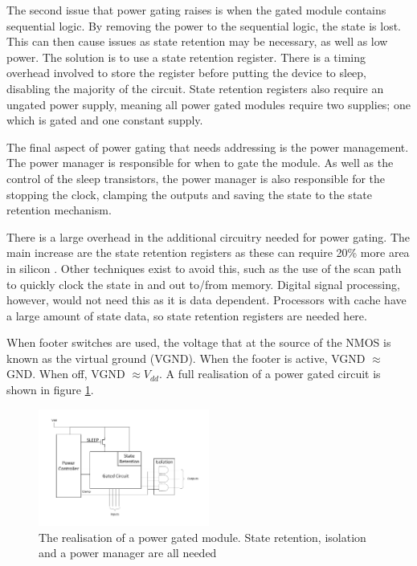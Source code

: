 The second issue that power gating raises is when the gated module contains sequential logic. 
By removing the power to the sequential logic, the state is lost. 
This can then cause issues as state retention may be necessary, as well as low power.
The solution is to use a state retention register. 
There is a timing overhead involved to store the register before putting the device to sleep, disabling the majority of the circuit. 
State retention registers also require an ungated power supply, meaning all power gated modules require two supplies; one which is gated and one constant supply.

The final aspect of power gating that needs addressing is the power management.
The power manager is responsible for when to gate the module.%
As well as the control of the sleep transistors, the power manager is also responsible for the stopping the clock, clamping the outputs and saving the state to the state retention mechanism.

There is a large overhead in the additional circuitry needed for power gating. 
The main increase are the state retention registers as these can require 20\% more area in silicon \cite{stateretarea}. 
Other techniques exist to avoid this, such as the use of the scan path to quickly clock the state in and out to/from memory.
Digital signal processing, however, would not need this as it is data dependent. 
Processors with cache have a large amount of state data, so state retention registers are needed here.

When footer switches are used, the voltage that at the source of the NMOS is known as the virtual ground (VGND). When the footer is active, VGND $\approx$ GND. When off, VGND $\approx V_{dd}$.
A full realisation of a power gated circuit is shown in figure \ref{fig:powergated}. 


\begin{figure}
\includegraphics[width=0.5\textwidth]{Figures/powergating_full.pdf}
\caption{The realisation of a power gated module. State retention, isolation and a power manager are all needed}
\label{fig:powergated}
\end{figure}


